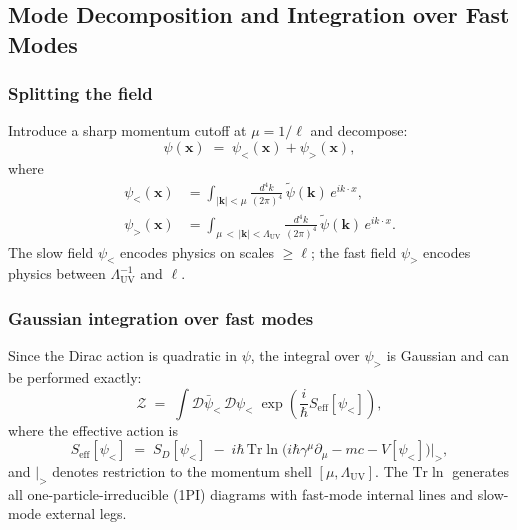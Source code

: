 \documentclass[11pt,a4paper]{article}
\theoremstyle{definition}
\theoremstyle{remark}
\begin{document}
	\subsection{Mode Decomposition and Integration over Fast Modes}
	\label{sec:mode_int}
	
	\subsubsection{Splitting the field}
	
	Introduce a sharp momentum cutoff at $\mu = 1/\ell$ and decompose:
	\begin{equation}
		\psi(\mathbf{x}) \;=\; \psi_{<}(\mathbf{x}) + \psi_{>}(\mathbf{x}),
		\label{eq:field_split}
	\end{equation}
	where
	\begin{align}
		\psi_{<}(\mathbf{x})
		&= \int_{|\mathbf{k}|<\mu}
		\frac{d^4k}{(2\pi)^4}\,\tilde{\psi}(\mathbf{k})\,e^{ik\cdot x},\\
		\psi_{>}(\mathbf{x})
		&= \int_{\mu\,<\,|\mathbf{k}|<\Lambda_{\mathrm{UV}}}
		\frac{d^4k}{(2\pi)^4}\,\tilde{\psi}(\mathbf{k})\,e^{ik\cdot x}.
	\end{align}
	The slow field $\psi_{<}$ encodes physics on scales $\geq \ell$; the fast field
	$\psi_{>}$ encodes physics between $\Lambda_{\mathrm{UV}}^{-1}$ and $\ell$.
	
	\subsubsection{Gaussian integration over fast modes}
	
	Since the Dirac action is quadratic in $\psi$, the integral over $\psi_{>}$
	is Gaussian and can be performed exactly:
	\begin{equation}
		\mathcal{Z} \;=\;
		\int \mathcal{D}\bar{\psi}_{<}\,\mathcal{D}\psi_{<}\;
		\exp\!\left(\frac{i}{\hbar}S_{\mathrm{eff}}[\psi_{<}]\right),
		\label{eq:effective_pi}
	\end{equation}
	where the effective action is
	\begin{equation}
		S_{\mathrm{eff}}[\psi_{<}]
		\;=\; S_D[\psi_{<}]
		\;-\; i\hbar\,\mathrm{Tr}\ln
		\bigl(i\hbar\gamma^\mu\partial_\mu - mc - V[\psi_{<}]\bigr)
		\Big|_{>},
		\label{eq:Seff_exact}
	\end{equation}
	and $|_{>}$ denotes restriction to the momentum shell
	$[\mu, \Lambda_{\mathrm{UV}}]$.  The $\mathrm{Tr}\ln$ generates all
	one-particle-irreducible (1PI) diagrams with fast-mode internal lines and
	slow-mode external legs.
	
\end{document}
